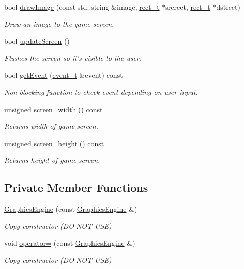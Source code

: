 \begin{DoxyCompactItemize}
bool \hyperlink{classGraphicsEngine_a47be08aa9a766dce3b32b6814fb5b6ed}{draw\-Image} (const std\-::string \&image, \hyperlink{GraphicsEngine_8hh_a9a150f1ad43ec7de65cfe698cdae8bee}{rect\-\_\-t} $\ast$srcrect, \hyperlink{GraphicsEngine_8hh_a9a150f1ad43ec7de65cfe698cdae8bee}{rect\-\_\-t} $\ast$dstrect)
\begin{DoxyCompactList}\small\item\em Draw an image to the game screen. \end{DoxyCompactList}\item 
bool \hyperlink{classGraphicsEngine_aeadd04c5518ef05b039241cbb7d09b59}{update\-Screen} ()
\begin{DoxyCompactList}\small\item\em Flushes the screen so it's visible to the user. \end{DoxyCompactList}\item 
bool \hyperlink{classGraphicsEngine_acdcf6935481bebcc5f45e7fd18dcf016}{get\-Event} (\hyperlink{GraphicsEngine_8hh_a2fb9b58e4e5f14f40af8b4a1425841f8}{event\-\_\-t} \&event) const 
\begin{DoxyCompactList}\small\item\em Non-\/blocking function to check event depending on user input. \end{DoxyCompactList}\item 
unsigned \hyperlink{classGraphicsEngine_a7598618ef7de1ba7813e41471938f2c1}{screen\-\_\-width} () const 
\begin{DoxyCompactList}\small\item\em Returns width of game screen. \end{DoxyCompactList}\item 
unsigned \hyperlink{classGraphicsEngine_af7d7440d76fda157dae03aabc9388a83}{screen\-\_\-height} () const 
\begin{DoxyCompactList}\small\item\em Returns height of game screen. \end{DoxyCompactList}\end{DoxyCompactItemize}
\subsection*{Private Member Functions}
\begin{DoxyCompactItemize}
\item 
\hyperlink{classGraphicsEngine_a6b6f92b943fc986f687b4d7797f2fa2a}{Graphics\-Engine} (const \hyperlink{classGraphicsEngine}{Graphics\-Engine} \&)
\begin{DoxyCompactList}\small\item\em Copy constructor (D\-O N\-O\-T U\-S\-E) \end{DoxyCompactList}\item 
void \hyperlink{classGraphicsEngine_af942976c09aac7332c8425b6a0130688}{operator=} (const \hyperlink{classGraphicsEngine}{Graphics\-Engine} \&)
\begin{DoxyCompactList}\small\item\em Copy constructor (D\-O N\-O\-T U\-S\-E) \end{DoxyCompactList}\end{DoxyCompactItemize}
